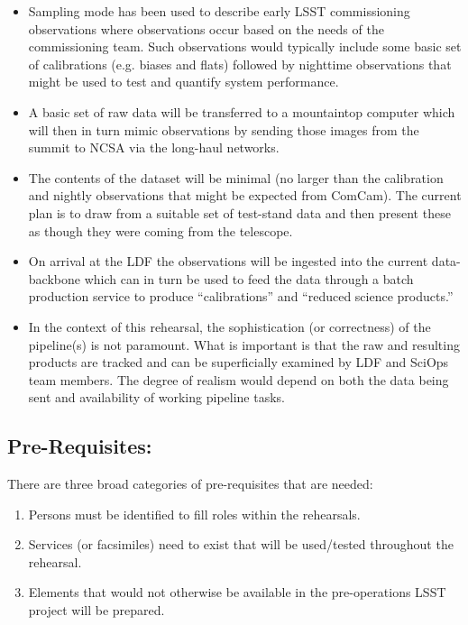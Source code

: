 \begin{itemize}[topsep=-8pt]
\item Sampling mode has been used to describe early LSST commissioning 
observations where observations occur based on the needs of the commissioning 
team.  Such observations would typically include some basic set of calibrations
(e.g. biases and flats) followed by nighttime observations that might be used to 
test and quantify system performance.

\item A basic set of raw data will be transferred to a mountaintop computer 
which will then in turn mimic observations by sending those images from the
summit to NCSA via the long-haul networks.

\item The contents of the dataset will be minimal (no larger than the 
calibration and nightly observations that might be expected from ComCam).  
The current plan is to draw from a suitable set of test-stand data and 
then present these as though they were coming from the telescope.

\item On arrival at the LDF the observations will be ingested into the current 
data-backbone which can in turn be used to feed the data through a batch 
production service to produce ``calibrations'' and ``reduced science products.''

\item In the context of this rehearsal, the sophistication (or correctness) 
of the pipeline(s) is not paramount.  What is important is that the raw and 
resulting products are tracked and can be superficially examined by LDF and 
SciOps team members.  The degree of realism would depend on both the data
being sent and availability of working pipeline tasks.
\end{itemize}


\subsection{Pre-Requisites:}

There are three broad categories of pre-requisites that are needed:
\begin{enumerate}[topsep=-8pt]
\item Persons must be identified to fill roles within the rehearsals.
\item Services (or facsimiles) need to exist that will be used/tested throughout the 
rehearsal.
\item Elements that would not otherwise 
be available in the pre-operations LSST project will be prepared.
\end{enumerate}
 
